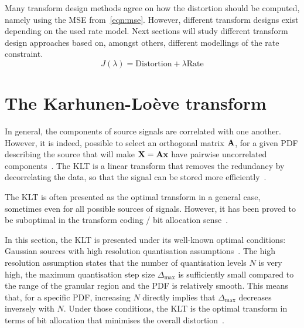\documentclass[11pt,a4paper,openright,twoside]{book}
\numberwithin{equation}{section} %
\numberwithin{figure}{section} %
\numberwithin{table}{section} %
\begin{document}
Many transform design methods agree on how the distortion should be
computed, namely using the \ac{MSE} from~\eqref{eqn:mse}.
However, different transform designs exist depending on the used rate
model.
Next sections will study different transform design approaches based on,
amongst others, different modellings of the rate constraint.
\begin{equation}
	J(\lambda) = \text{Distortion} + \lambda \text{Rate}
	\label{eqn:transform_design}
\end{equation}

\section{The Karhunen-Loève transform}
\label{sec:the_karhunen_loeve_transform}
In general, the components of source signals are correlated with one
another.
However, it is indeed, possible to select an orthogonal matrix $\mathbf{A}$, for
a given \ac{PDF} describing the source that will make $\mathbf{X}=\mathbf{A}\mathbf{x}$ have
pairwise uncorrelated components~\cite{gersho-92-vector-quantization}.
The \ac{KLT} is a linear transform that removes the redundancy by
decorrelating the data, so that the signal can be stored more
efficiently~\cite{rao-01-transform-data-compression-book}.

The \ac{KLT} is often presented as the optimal transform in a general
case, sometimes even for all possible sources of signals.
However, it has been proved to be suboptimal in the transform coding /
bit allocation sense~\cite{effros-04-suboptimal-klt}.

In this section, the \ac{KLT} is presented under its well-known optimal
conditions: Gaussian sources with high resolution quantisation
assumptions~\cite{goyal-00-high-resolution}.
The high resolution assumption states that the number of quantisation
levels $N$ is very high, the maximum quantisation step size
$\Delta_{\max}$ is sufficiently small compared to the range of the
granular region and the \ac{PDF} is relatively smooth.
This means that, for a specific \ac{PDF}, increasing $N$ directly
implies that $\Delta_{\max}$ decreases inversely with $N$.
Under those conditions, the \ac{KLT} is the optimal transform in terms
of bit allocation that minimises the overall
distortion~\cite{gersho-92-vector-quantization}.
\end{document}
